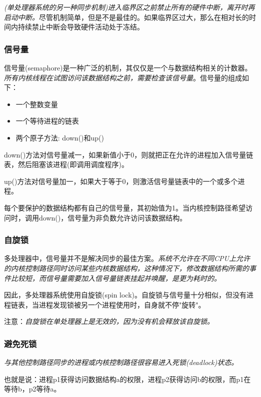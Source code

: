     \emph{(单处理器系统的另一种同步机制)进入临界区之前禁止所有的硬件中断，离开时再启动中断。}尽管机制简单，但是不是最佳的。如果临界区过大，那么在相对长的时间内持续禁止中断会导致硬件活动处于冻结。

\subsubsection{信号量}

    信号量(semaphore)是一种广泛的机制，其仅仅是一个与数据结构相关的计数器。\emph{所有内核线程在试图访问该数据结构之前，需要检查该信号量}。信号量的组成如下：

\begin{itemize}
    \item 一个整数变量
    \item 一个等待进程的链表
    \item 两个原子方法: down()和up()
\end{itemize}

    down()方法对信号量减一，如果新值小于0，则就把正在允许的进程加入信号量链表，然后阻塞该进程(即调用调度程序)。

    up()方法对信号量加一，如果大于等于0，则激活信号量链表中的一个或多个进程。

    每个要保护的数据结构都有自己的信号量，其初始值为1。当内核控制路径希望访问时，调用down()，信号量为非负数允许访问该数据结构。

\subsubsection{自旋锁}

    多处理器中，信号量并不是解决同步的最佳方案。\emph{系统不允许在不同CPU上允许的内核控制路径同时访问某些内核数据结构，这种情况下，修改数据结构所需的事件比较短，而信号量需要加入信号量链表挂起并唤醒，是更为耗时的。}

    因此，多处理器系统使用自旋锁(spin lock)。自旋锁与信号量十分相似，但没有进程链表，当进程发现锁被另一个进程使用时，自身就不停"旋转"。

    注意：\emph{自旋锁在单处理器上是无效的，因为没有机会释放该自旋锁。}

\subsubsection{避免死锁}

    \emph{与其他控制路径同步的进程或内核控制路径很容易进入死锁(deadlock)状态。}

    也就是说：进程p1获得访问数据结构a的权限，进程p2获得访问b的权限，而p1在等待b，p2等待a。


